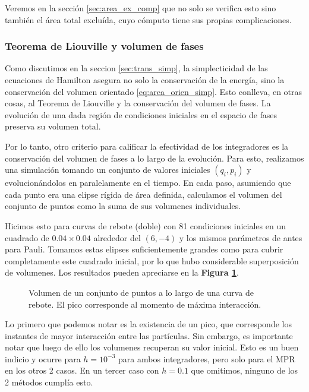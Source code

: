 Veremos en la sección \ref{sec:area_ex_comp} que no solo se verifica esto sino también el área total excluída, cuyo cómputo tiene sus propias complicaciones.


\subsubsection{Teorema de Liouville y volumen de fases}

Como discutimos en la seccion \ref{sec:trans_simp}, la simplecticidad de las ecuaciones de Hamilton asegura no solo la conservación de la energía, sino la conservación del volumen orientado \eqref{eq:area_orien_simp}.
Esto conlleva, en otras cosas, al Teorema de Liouville y la conservación del volumen de fases.
La evolución de una dada región de condiciones iniciales en el espacio de fases preserva su volumen total.

Por lo tanto, otro criterio para calificar la efectividad de los integradores es la conservación del volumen de fases a lo largo de la evolución.
Para esto, realizamos una simulación tomando un conjunto de valores iniciales $(q_i, p_i)$ y evolucionándolos en paralelamente en el tiempo.
En cada paso, asumiendo que cada punto era una elipse rígida de área definida, calculamos el volumen del conjunto de puntos como la suma de sus volumenes individuales.

Hicimos esto para curvas de rebote (doble) con 81 condiciones iniciales en un cuadrado de $0.04\times0.04$ alrededor del $(6, -4)$ y los mismos parámetros de antes para Pauli.
Tomamos estas elipses suficientemente grandes como para cubrir completamente este cuadrado inicial, por lo que hubo considerable superposición de volumenes.
Los resultados pueden apreciarse en la \textbf{Figura \ref{fig:vol_fas}}.

\begin{figure}[h]
	\centering
	\caption{Volumen de un conjunto de puntos a lo largo de una curva de rebote. El pico corresponde al momento de máxima interacción.}
	\label{fig:vol_fas}
\end{figure}

Lo primero que podemos notar es la existencia de un pico, que corresponde los instantes de mayor interacción entre las partículas.
Sin embargo, es importante notar que luego de ello los volumenes recuperan su valor inicial.
Esto es un buen indicio y ocurre para $h=10^{-3}$ para ambos integradores, pero solo para el MPR en los otros 2 casos.
En un tercer caso con $h=0.1$ que omitimos, ninguno de los 2 métodos cumplía esto.

